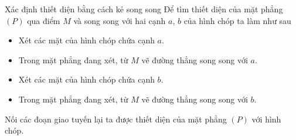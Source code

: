 \begin{dang}{Xác định thiết diện bằng cách kẻ song song}
	Để tìm thiết diện của mặt phẳng $(P)$ qua điểm $M$ và song song với hai cạnh $a$, $b$ của hình chóp ta làm như sau
	\begin{itemize}
		\item Xét các mặt của hình chóp chứa cạnh $a$.
		\item Trong mặt phẳng đang xét, từ $M$ vẽ đường thẳng song song với $a$.
		\item Xét các mặt của hình chóp chứa cạnh $b$.
		\item Trong mặt phẳng đang xét, từ $M$ vẽ đường thẳng song song với $b$.
	\end{itemize}
	Nối các đoạn giao tuyến lại ta được thiết diện của mặt phẳng $(P)$ với hình chóp.
\end{dang}
